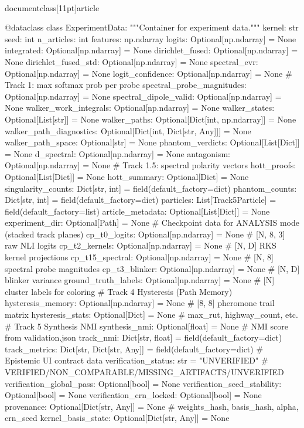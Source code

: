 \\documentclass[11pt]{article}
\begin{document}
\begin{CodeBlock}
@dataclass
class ExperimentData:
    """Container for experiment data."""
    kernel: str
    seed: int
    n_articles: int
    features: np.ndarray
    logits: Optional[np.ndarray] = None
    integrated: Optional[np.ndarray] = None
    dirichlet_fused: Optional[np.ndarray] = None
    dirichlet_fused_std: Optional[np.ndarray] = None
    spectral_evr: Optional[np.ndarray] = None
    logit_confidence: Optional[np.ndarray] = None  # Track 1: max softmax prob per probe
    spectral_probe_magnitudes: Optional[np.ndarray] = None
    spectral_dipole_valid: Optional[np.ndarray] = None
    walker_work_integrals: Optional[np.ndarray] = None
    walker_states: Optional[List[str]] = None
    walker_paths: Optional[Dict[int, np.ndarray]] = None
    walker_path_diagnostics: Optional[Dict[int, Dict[str, Any]]] = None
    walker_path_space: Optional[str] = None
    phantom_verdicts: Optional[List[Dict]] = None
    d_spectral: Optional[np.ndarray] = None
    antagonism: Optional[np.ndarray] = None  # Track 1.5: spectral polarity vectors
    hott_proofs: Optional[List[Dict]] = None
    hott_summary: Optional[Dict] = None
    singularity_counts: Dict[str, int] = field(default_factory=dict)
    phantom_counts: Dict[str, int] = field(default_factory=dict)
    particles: List[Track5Particle] = field(default_factory=list)
    article_metadata: Optional[List[Dict]] = None
    experiment_dir: Optional[Path] = None
    # Checkpoint data for ANALYSIS mode (stacked track planes)
    cp_t0_logits: Optional[np.ndarray] = None      # [N, 8, 3] raw NLI logits
    cp_t2_kernels: Optional[np.ndarray] = None     # [N, D] RKS kernel projections
    cp_t15_spectral: Optional[np.ndarray] = None   # [N, 8] spectral probe magnitudes
    cp_t3_blinker: Optional[np.ndarray] = None     # [N, D] blinker variance
    ground_truth_labels: Optional[np.ndarray] = None  # [N] cluster labels for coloring
    # Track 4 Hysteresis (Path Memory)
    hysteresis_memory: Optional[np.ndarray] = None    # [8, 8] pheromone trail matrix
    hysteresis_stats: Optional[Dict] = None           # max_rut, highway_count, etc.
    # Track 5 Synthesis NMI
    synthesis_nmi: Optional[float] = None             # NMI score from validation.json
    track_nmi: Dict[str, float] = field(default_factory=dict)
    track_metrics: Dict[str, Dict[str, Any]] = field(default_factory=dict)
    # Epistemic UI contract data
    verification_status: str = "UNVERIFIED"           # VERIFIED/NON_COMPARABLE/MISSING_ARTIFACTS/UNVERIFIED
    verification_global_pass: Optional[bool] = None
    verification_seed_stability: Optional[bool] = None
    verification_crn_locked: Optional[bool] = None
    provenance: Optional[Dict[str, Any]] = None       # weights_hash, basis_hash, alpha, crn_seed
    kernel_basis_state: Optional[Dict[str, Any]] = None



\end{CodeBlock}
\end{document}
